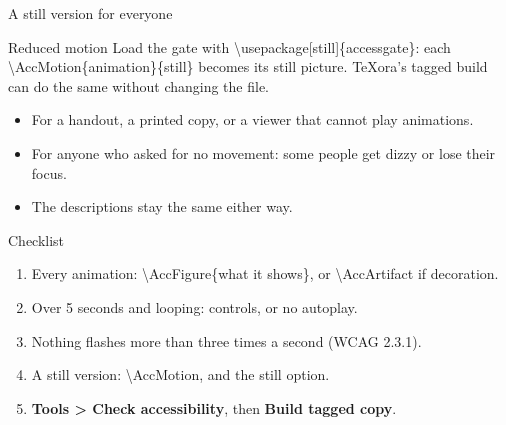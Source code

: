 \documentclass[aspectratio=169]{beamer}
\newcommand{\code}[1]{{\small\ttfamily #1}}
\begin{document}
\begin{frame}{A still version for everyone}
  \begin{block}{Reduced motion}
    Load the gate with \code{\textbackslash usepackage[still]\{accessgate\}}: each
    \code{\textbackslash AccMotion\{animation\}\{still\}} becomes its still picture. TeXora's
    tagged build can do the same without changing the file.
  \end{block}
  \par\medskip
  \begin{itemize}
    \item For a handout, a printed copy, or a viewer that cannot play animations.
    \item For anyone who asked for no movement: some people get dizzy or lose their focus.
    \item The descriptions stay the same either way.
  \end{itemize}
\end{frame}

\begin{frame}{Checklist}
  \begin{enumerate}
    \item Every animation: \code{\textbackslash AccFigure\{what it shows\}}, or \code{\textbackslash AccArtifact} if decoration.
    \item Over 5 seconds and looping: \code{controls}, or no \code{autoplay}.
    \item Nothing flashes more than three times a second (WCAG 2.3.1).
    \item A still version: \code{\textbackslash AccMotion}, and the \code{still} option.
    \item \textbf{Tools > Check accessibility}, then \textbf{Build tagged copy}.
  \end{enumerate}
\end{frame}
\end{document}
